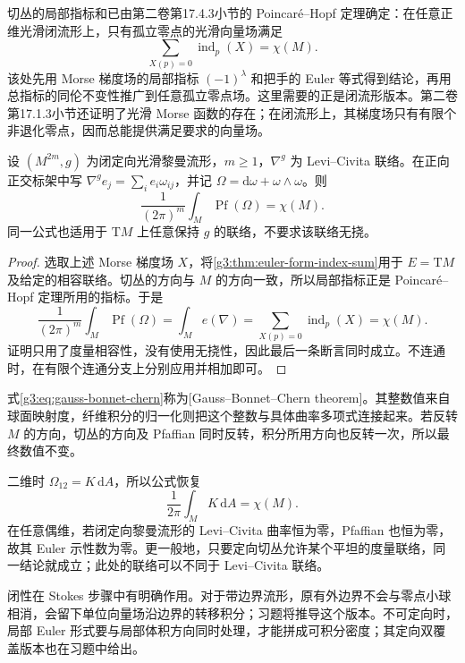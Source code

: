 切丛的局部指标和已由第二卷第17.4.3小节的 Poincaré--Hopf 定理确定：在任意正维光滑闭流形上，只有孤立零点的光滑向量场满足
\[
	\sum_{X(p)=0}\operatorname{ind}_p(X)=\chi(M).
\]
该处先用 Morse 梯度场的局部指标 \((-1)^\lambda\) 和把手的 Euler 等式得到结论，再用总指标的同伦不变性推广到任意孤立零点场。这里需要的正是闭流形版本。第二卷第17.1.3小节还证明了光滑 Morse 函数的存在；在闭流形上，其梯度场只有有限个非退化零点，因而总能提供满足要求的向量场。

\begin{theorem}\label{g3:thm:gauss-bonnet-chern}
	设 \((M^{2m},g)\) 为闭定向光滑黎曼流形，\(m\ge1\)，\(\nabla^g\) 为 Levi--Civita 联络。在正向正交标架中写
	\(\nabla^ge_j=\sum_i e_i\omega_{ij}\)，并记
	\(\Omega=\mathrm d\omega+\omega\wedge\omega\)。则
	\begin{equation}\label{g3:eq:gauss-bonnet-chern}
		\frac1{(2\pi)^m}\int_M\operatorname{Pf}(\Omega)=\chi(M).
	\end{equation}
	同一公式也适用于 \(\mathrm TM\) 上任意保持 \(g\) 的联络，不要求该联络无挠。
\end{theorem}
\begin{proof}
	选取上述 Morse 梯度场 \(X\)，将\cref{g3:thm:euler-form-index-sum}用于 \(E=\mathrm TM\) 及给定的相容联络。切丛的方向与 \(M\) 的方向一致，所以局部指标正是 Poincaré--Hopf 定理所用的指标。于是
	\[
		\frac1{(2\pi)^m}\int_M\operatorname{Pf}(\Omega)
		=\int_Me(\nabla)
		=\sum_{X(p)=0}\operatorname{ind}_p(X)
		=\chi(M).
	\]
	证明只用了度量相容性，没有使用无挠性，因此最后一条断言同时成立。不连通时，在有限个连通分支上分别应用并相加即可。
\end{proof}

式\eqref{g3:eq:gauss-bonnet-chern}称为[Gauss--Bonnet--Chern theorem]。其整数值来自球面映射度，纤维积分的归一化则把这个整数与具体曲率多项式连接起来。若反转 \(M\) 的方向，切丛的方向及 Pfaffian 同时反转，积分所用方向也反转一次，所以最终数值不变。

\begin{example}\label{g3:exm:euler-surface-and-flat}
	二维时 \(\Omega_{12}=K\,\mathrm dA\)，所以公式恢复
	\[
		\frac1{2\pi}\int_MK\,\mathrm dA=\chi(M).
	\]
	在任意偶维，若闭定向黎曼流形的 Levi--Civita 曲率恒为零，Pfaffian 也恒为零，故其 Euler 示性数为零。更一般地，只要定向切丛允许某个平坦的度量联络，同一结论就成立；此处的联络可以不同于 Levi--Civita 联络。
\end{example}

闭性在 Stokes 步骤中有明确作用。对于带边界流形，原有外边界不会与零点小球相消，会留下单位向量场沿边界的转移积分；习题将推导这个版本。不可定向时，局部 Euler 形式要与局部体积方向同时处理，才能拼成可积分密度；其定向双覆盖版本也在习题中给出。
